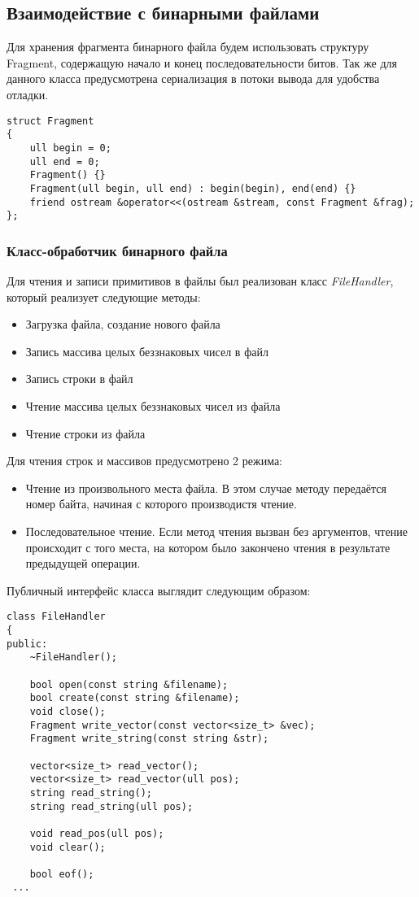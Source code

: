 \documentclass[14pt, russian]{scrartcl}
\begin{document}
\subsection{Взаимодействие с бинарными файлами}

Для хранения фрагмента бинарного файла будем использовать структуру Fragment, содержащую начало и конец последовательности битов. Так же для данного класса предусмотрена сериализация в потоки вывода для удобства отладки.

\begin{verbatim}
struct Fragment
{
	ull begin = 0;
	ull end = 0;
	Fragment() {}
	Fragment(ull begin, ull end) : begin(begin), end(end) {}
	friend ostream &operator<<(ostream &stream, const Fragment &frag);
};
\end{verbatim}

\subsubsection{Класс-обработчик бинарного файла}

Для чтения и записи примитивов в файлы был реализован класс \textit{FileHandler}, который реализует следующие методы:
\begin{itemize}
    \item Загрузка файла, создание нового файла
    \item Запись массива целых беззнаковых чисел в файл
    \item Запись строки в файл
    \item Чтение массива целых беззнаковых чисел из файла
    \item Чтение строки из файла
\end{itemize}

Для чтения строк и массивов предусмотрено 2 режима:
\begin{itemize}
    \item Чтение из произвольного места файла. В этом случае методу передаётся номер байта, начиная с которого производистя чтение.
    \item Последовательное чтение. Если метод чтения вызван без аргументов, чтение происходит с того места, на котором было закончено чтения в результате предыдущей операции.
\end{itemize}

Публичный интерфейс класса выглядит следующим образом:
\begin{verbatim}
class FileHandler
{
public:
	~FileHandler();

	bool open(const string &filename);
	bool create(const string &filename);
	void close();
	Fragment write_vector(const vector<size_t> &vec);
	Fragment write_string(const string &str);

	vector<size_t> read_vector();
	vector<size_t> read_vector(ull pos);
	string read_string();
	string read_string(ull pos);

	void read_pos(ull pos);
	void clear();

	bool eof();
 ...
\end{verbatim}
\end{document}
